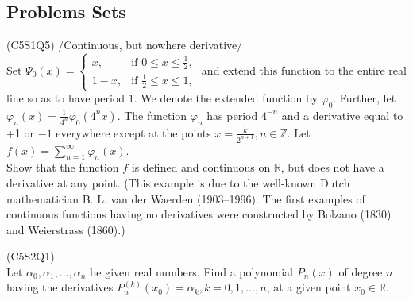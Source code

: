 \subsection{Problems Sets}
\begin{prb}
    (C5S1Q5) /Continuous, but nowhere derivative/ \\
    Set $\Psi_0(x) = \begin{cases} x, & \text{if } 0 \leq x \leq \frac{1}{2}, \\ 1 - x, & \text{if } \frac{1}{2} \leq x \leq 1, \end{cases}$ and extend this 
    function to the entire real line so as to have period 1. We denote the extended function by $\varphi_0$. Further, let $\varphi_n(x) = \frac{1}{4^n} 
    \varphi_0(4^n x)$. The function $\varphi_n$ has period $4^{-n}$ and a derivative equal to +1 or $-1$ everywhere except at the points $x = \frac{k}{2^{n+1}}, 
    n \in \mathbb{Z}$. Let $f(x) = \sum_{n=1}^\infty \varphi_n(x)$. \\
    Show that the function $f$ is defined and continuous on $\mathbb{R}$, but does not have a derivative at any point.
    (This example is due to the well-known Dutch mathematician B. L. van der Waerden (1903–1996). The first examples of continuous functions having no derivatives 
    were constructed by Bolzano (1830) and Weierstrass (1860).)
\end{prb}
\newline\newline
{}

\begin{prb}
    (C5S2Q1) \\
    Let $\alpha_0, \alpha_1, \dots , \alpha_n$ be given real numbers. Find a polynomial $P_n(x)$ of degree $n$ having the derivatives $P_n^{(k)}(x_0) = \alpha_k, 
    k = 0, 1, \dots , n$, at a given point $x_0 \in \mathbb{R}$.
\end{prb}

